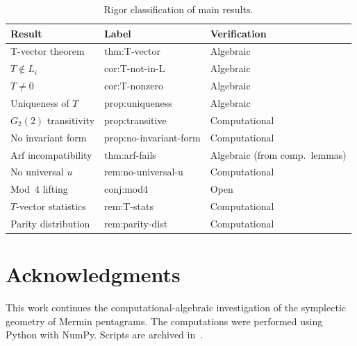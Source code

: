 \documentclass[11pt,a4paper]{article}
\theoremstyle{remark}
\begin{document}
\begin{table}[H]
\centering
\begin{tabular}{l l l}
\toprule
\textbf{Result} & \textbf{Label} & \textbf{Verification} \\
\midrule
T-vector theorem & thm:T-vector & Algebraic \\
$T \notin L_i$ & cor:T-not-in-L & Algebraic \\
$T \neq 0$ & cor:T-nonzero & Algebraic \\
Uniqueness of $T$ & prop:uniqueness & Algebraic \\
$G_2(2)$ transitivity & prop:transitive & Computational \\
No invariant form & prop:no-invariant-form & Computational \\
Arf incompatibility & thm:arf-fails & Algebraic (from comp.\ lemmas) \\
No universal $u$ & rem:no-universal-u & Computational \\
Mod~4 lifting & conj:mod4 & Open \\
$T$-vector statistics & rem:T-stats & Computational \\
Parity distribution & rem:parity-dist & Computational \\
\bottomrule
\end{tabular}
\caption{Rigor classification of main results.}
\label{tab:rigor}
\end{table}

\section*{Acknowledgments}

This work continues the computational-algebraic investigation of the
symplectic geometry of Mermin pentagrams. The computations were
performed using Python with NumPy. Scripts are archived
in~\cite{PaperXIIsuppl}.
\end{document}
